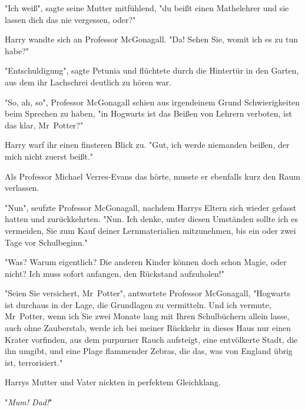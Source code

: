 "Ich weiß", sagte seine Mutter mitfühlend, "du beißt einen Mathelehrer und sie lassen dich das nie vergessen, oder?"

Harry wandte sich an Professor McGonagall. "Da! Sehen Sie, womit ich es zu tun habe?"

"Entschuldigung", sagte Petunia und flüchtete durch die Hintertür in den Garten, aus dem ihr Lachschrei deutlich zu hören war.

"So, ah, so", Professor McGonagall schien aus irgendeinem Grund Schwierigkeiten beim Sprechen zu haben, "in Hogwarts ist das Beißen von Lehrern verboten, ist das klar, Mr~Potter?"

Harry warf ihr einen finsteren Blick zu. "Gut, ich werde niemanden beißen, der mich nicht zuerst beißt."

Als Professor Michael Verres-Evans das hörte, musste er ebenfalls kurz den Raum verlassen.

"Nun", seufzte Professor McGonagall, nachdem Harrys Eltern sich wieder gefasst hatten und zurückkehrten. "Nun. Ich denke, unter diesen Umständen sollte ich es vermeiden, Sie zum Kauf deiner Lernmaterialien mitzunehmen, bis ein oder zwei Tage vor Schulbeginn."

"Was? Warum eigentlich? Die anderen Kinder können doch schon Magie, oder nicht? Ich muss sofort anfangen, den Rückstand aufzuholen!"

"Seien Sie versichert, Mr~Potter", antwortete Professor McGonagall, "Hogwarts ist durchaus in der Lage, die Grundlagen zu vermitteln. Und ich vermute, Mr~Potter, wenn ich Sie zwei Monate lang mit Ihren Schulbüchern allein lasse, auch ohne Zauberstab, werde ich bei meiner Rückkehr in dieses Haus nur einen Krater vorfinden, aus dem purpurner Rauch aufsteigt, eine entvölkerte Stadt, die ihn umgibt, und eine Plage flammender Zebras, die das, was von England übrig ist, terrorisiert."

Harrys Mutter und Vater nickten in perfektem Gleichklang.

"\emph{Mum! Dad!}"

